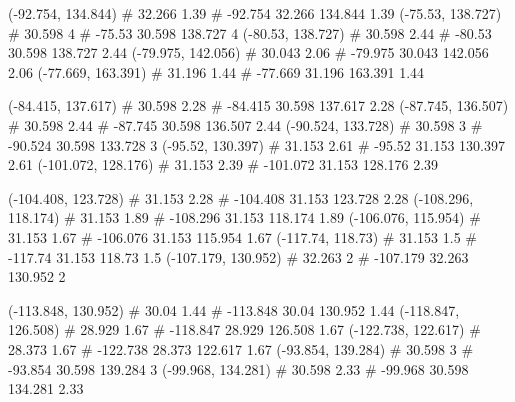 \documentclass[a4paper,openbib,10pt]{article}
\newenvironment{treegraph}{\begin{graph}}{\end{graph}}
\begin{document}
\begin{treegraph}
  (-92.754, 134.844) #     32.266    1.39
   #    -92.754    32.266    134.844    1.39
  (-75.53, 138.727) #     30.598    4
   #    -75.53    30.598    138.727    4
  (-80.53, 138.727) #     30.598    2.44
   #    -80.53    30.598    138.727    2.44
  (-79.975, 142.056) #     30.043    2.06
   #    -79.975    30.043    142.056    2.06
  (-77.669, 163.391) #     31.196    1.44
   #    -77.669    31.196    163.391    1.44

  (-84.415, 137.617) #     30.598    2.28
   #    -84.415    30.598    137.617    2.28
  (-87.745, 136.507) #     30.598    2.44
   #    -87.745    30.598    136.507    2.44
  (-90.524, 133.728) #     30.598    3
   #    -90.524    30.598    133.728    3
  (-95.52, 130.397) #     31.153    2.61
   #    -95.52    31.153    130.397    2.61
  (-101.072, 128.176) #     31.153    2.39
   #    -101.072    31.153    128.176    2.39

  (-104.408, 123.728) #     31.153    2.28
   #    -104.408    31.153    123.728    2.28
  (-108.296, 118.174) #     31.153    1.89
   #    -108.296    31.153    118.174    1.89
  (-106.076, 115.954) #     31.153    1.67
   #    -106.076    31.153    115.954    1.67
  (-117.74, 118.73) #     31.153    1.5
   #    -117.74    31.153    118.73    1.5
  (-107.179, 130.952) #     32.263    2
   #    -107.179    32.263    130.952    2

  (-113.848, 130.952) #     30.04    1.44
   #    -113.848    30.04    130.952    1.44
  (-118.847, 126.508) #     28.929    1.67
   #    -118.847    28.929    126.508    1.67
  (-122.738, 122.617) #     28.373    1.67
   #    -122.738    28.373    122.617    1.67
  (-93.854, 139.284) #     30.598    3
   #    -93.854    30.598    139.284    3
  (-99.968, 134.281) #     30.598    2.33
   #    -99.968    30.598    134.281    2.33


\end{treegraph}
\end{document}
